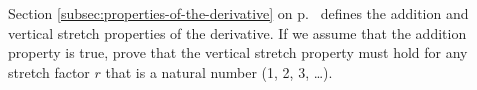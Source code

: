 Section \ref{subsec:properties-of-the-derivative} on p.~\pageref{subsec:properties-of-the-derivative}
defines the addition and vertical stretch properties of the derivative.
If we assume that the addition property is true, prove that the vertical stretch
property must hold for any stretch factor $r$ that is a natural number
(1, 2, 3, \ldots).
